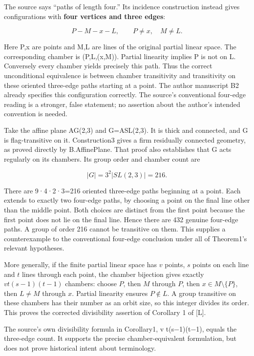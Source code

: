 The source says ``paths of length four.'' Its incidence construction
instead gives configurations with \textbf{four vertices and three
edges}:

\[
 P-M-x-L,\qquad P\ne x,\quad M\ne L.
\]

Here P,x are points and M,L are lines of the original partial linear
space. The corresponding chamber is (P,L,(x,M)). Partial linearity
implies P is not on L. Conversely every chamber yields precisely this
path. Thus the correct unconditional equivalence is between chamber
transitivity and transitivity on these oriented three-edge paths
starting at a point. The author manuscript B2 already specifies this
configuration correctly. The source's conventional four-edge reading is
a stronger, false statement; no assertion about the author's intended
convention is needed.

Take the affine plane AG(2,3) and G=ASL(2,3). It is thick and connected,
and G is flag-transitive on it. Construction3 gives a firm residually
connected geometry, as proved directly by B.AffinePlane. That proof also
establishes that G acts regularly on its chambers. Its group order and
chamber count are

\[
 |G|=3^2|SL(2,3)|=216.
\]

There are 9·4·2·3=216 oriented three-edge paths beginning at a point.
Each extends to exactly two four-edge paths, by choosing a point on the
final line other than the middle point. Both choices are distinct from
the first point because the first point does not lie on the final line.
Hence there are 432 genuine four-edge paths. A group of order 216 cannot
be transitive on them. This supplies a counterexample to the
conventional four-edge conclusion under all of Theorem1's relevant
hypotheses.

More generally, if the finite partial linear space has $v$ points,
$s$ points on each line and $t$ lines through each point, the chamber
bijection gives exactly $vt(s-1)(t-1)$ chambers: choose $P$, then $M$
through $P$, then $x\in M\setminus\{P\}$, then $L\ne M$ through $x$.
Partial linearity ensures $P\notin L$. A group transitive on these
chambers has their number as an orbit size, so this integer divides
its order. This proves the corrected divisibility assertion of
Corollary 1 of [L].

The source's own divisibility formula in Corollary1, v t(s−1)(t−1),
equals the three-edge count. It supports the precise chamber-equivalent
formulation, but does not prove historical intent about terminology.
